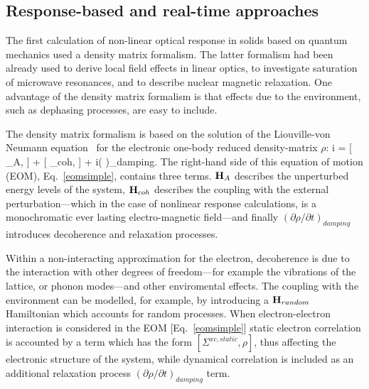 \subsection{Response-based and real-time approaches}
The first calculation of non-linear optical response in solids based on quantum mechanics used a density matrix formalism.\cite{bloembergen1964quantum} The latter formalism had been already used to derive local field effects in linear optics\cite{PhysRev.126.413,wiser1963dielectric}, to investigate  saturation of microwave resonances\cite{karplus1948note}, and to describe nuclear magnetic relaxation\cite{kubo1954general,RevModPhys.33.249,PhysRev.102.104}. One advantage of the density matrix formalism is that effects due to the environment, such as dephasing processes, are easy to include.\cite{manzano2020short}

The density matrix formalism is based on the solution of the Liouville-von Neumann equation~\cite{neumann} for the electronic one-body reduced density-matrix $\rho$:
\be
i \hbar {} = [ \HH_A, \rho] + [ \HH_{coh}, \rho] + i\hbar \left (  \right )_{damping}.
\label{eomsimple}
\ee
The right-hand side of this equation of motion (EOM), Eq.~\ref{eomsimple}, contains three terms. ${\bf H}_A$ describes the unperturbed energy levels of the system, ${\bf H}_{coh}$ describes the coupling with the external perturbation---which in the case of nonlinear response calculations, is a monochromatic ever lasting electro-magnetic field---and finally $\left ( \partial \rho/\partial t \right )_{damping}$ introduces decoherence and relaxation processes.

Within a non-interacting approximation for the electron, decoherence is due to the interaction with other degrees of freedom---for example the vibrations of the lattice, or phonon modes---and other enviromental effects. The coupling with the environment can be modelled, for example, by introducing a ${\bf H}_{random}$ Hamiltonian which accounts for random processes. 
When electron-electron interaction is considered in the EOM [Eq.~\ref{eomsimple}] static electron correlation is accounted by a term which has the form $[\Sigma^{xc,static},\rho]$, thus affecting the electronic structure of the system, while dynamical correlation is included as an additional relaxation process $\left ( \partial \rho/\partial t \right )_{damping}$ term.

